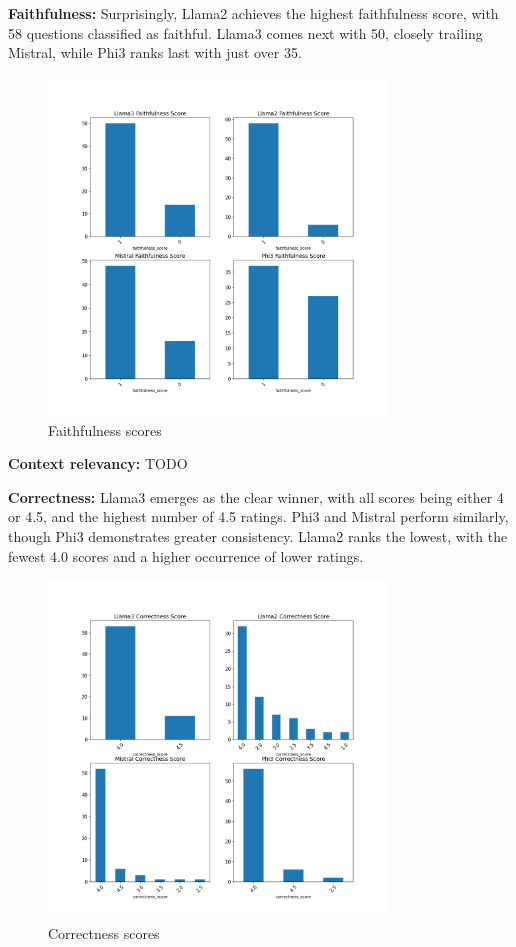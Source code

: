 \documentclass[]{article}
\begin{document}
\textbf{Faithfulness:}
Surprisingly, Llama2 achieves the highest faithfulness score, with 58 questions classified as faithful. 
Llama3 comes next with 50, closely trailing Mistral, while Phi3 ranks last with just over 35.
\begin{figure}[H]
    \centering
    \includegraphics[width=0.8\textwidth]{./images/faith_zara.png}
    \caption{Faithfulness scores}
    \label{fig:image_label}
\end{figure}

\textbf{Context relevancy:}
TODO

\textbf{Correctness:}
Llama3 emerges as the clear winner, with all scores being either 4 or 4.5, and the highest number of 4.5 ratings. Phi3 and Mistral perform similarly, though Phi3 demonstrates greater consistency. 
Llama2 ranks the lowest, with the fewest 4.0 scores and a higher occurrence of lower ratings.
\begin{figure}[H]
    \centering
    \includegraphics[width=0.8\textwidth]{./images/correct_zara.png}
    \caption{Correctness scores}
    \label{fig:image_label}
\end{figure}
\end{document}
